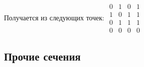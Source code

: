 \documentclass[12pt, a4paper, twoside]{report}
\begin{document}
Получается из следующих точек:
$
\begin{array}{cccc}
	0 & 1 & 0 & 1 \\
	1 & 0 & 1 & 1 \\
	0 & 1 & 1 & 1 \\
	0 & 0 & 0 & 0
\end{array}
$
\subsection{Прочие сечения}

\hline

\end{document}
